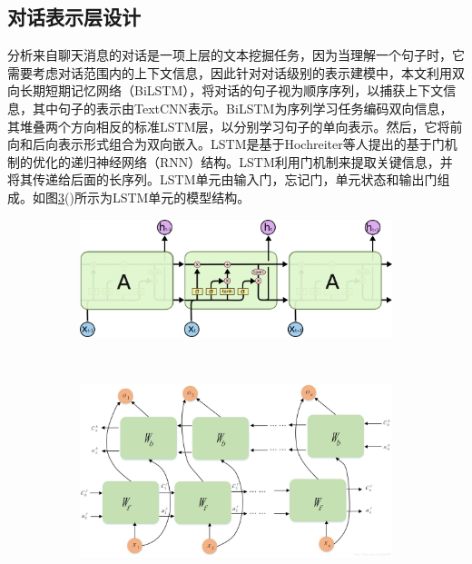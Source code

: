 \subsection{对话表示层设计}
分析来自聊天消息的对话是一项上层的文本挖掘任务，因为当理解一个句子时，它需要考虑对话范围内的上下文信息，因此针对对话级别的表示建模中，本文利用双向长期短期记忆网络（BiLSTM\cite{graves2013speech}），将对话的句子视为顺序序列，以捕获上下文信息，其中句子的表示由TextCNN表示。BiLSTM为序列学习任务编码双向信息，其堆叠两个方向相反的标准LSTM层，以分别学习句子的单向表示。然后，它将前向和后向表示形式组合为双向嵌入。LSTM是基于Hochreiter等人\cite{hochreiter1997long}提出的基于门机制的优化的递归神经网络（RNN）结构。LSTM利用门机制来提取关键信息，并将其传递给后面的长序列。LSTM单元由输入门，忘记门，单元状态和输出门组成。如图\ref{fig:lstm}()所示为LSTM单元的模型结构。
\begin{figure}[htb]
    \centering
    \begin{subfigure}[b]{0.45\textwidth}
      \includegraphics[width=\textwidth]{Img/lstm.png}
      \caption{}
      \label{fig:lstm}
    \end{subfigure}%
    ~%
    \begin{subfigure}[b]{0.45\textwidth}
      \includegraphics[width=\textwidth]{Img/bilstm.jpg}
      \caption{}
      \label{fig:bilstm}
    \end{subfigure}
    \label{fig:lstm}
\end{figure}

